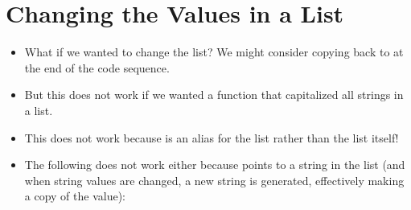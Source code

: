 \documentclass[letterpaper,10pt,english]{sphinxmanual}
\begin{document}
\section{Changing the Values in a List}
\label{\detokenize{lecture_notes/lec10_lists2:changing-the-values-in-a-list}}\begin{itemize}
\item {} 
What if we wanted to change the list?  We might consider copying
 back to  at the end of the code
sequence.

\item {} 
But this does not work if we wanted a function that capitalized all
strings in a list.

%
\begin{sphinxVerbatim}[commandchars=\\\{\}]
   
      \PYG{p}{[}\PYG{p}{]}
       
          
      

  \PYG{p}{[}    \PYG{p}{]}
     
\end{sphinxVerbatim}

\item {} 
This does not work because  is an alias for the list
rather than the list itself!

\item {} 
The following does not work either because  points to a string
in the list (and when string values are changed, a new string is
generated, effectively making  a copy of the value):


\end{itemize}
\end{document}
